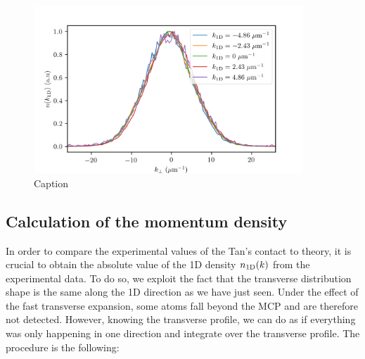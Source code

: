 \begin{figure}
    \centering
    \includegraphics[width=0.9\textwidth]{Fig/Chapter5/1D_transverse_effect.png}
    \caption{Caption}
    \label{fig:1D_transverse}
\end{figure}

\subsection{Calculation of the momentum density}


\label{sec:1D_calculation_momentum_density}

In order to compare the experimental values of the Tan's contact to theory, it is crucial to obtain the absolute value of the 1D density $n_{\rm{1D}}(k)$ from the experimental data. To do so, we exploit the fact that the transverse distribution shape is the same along the 1D direction as we have just seen. Under the effect of the fast transverse expansion, some atoms fall beyond the MCP and are therefore not detected. However, knowing the transverse profile, we can do as if everything was only happening in one direction and integrate over the transverse profile. The procedure is the following:

